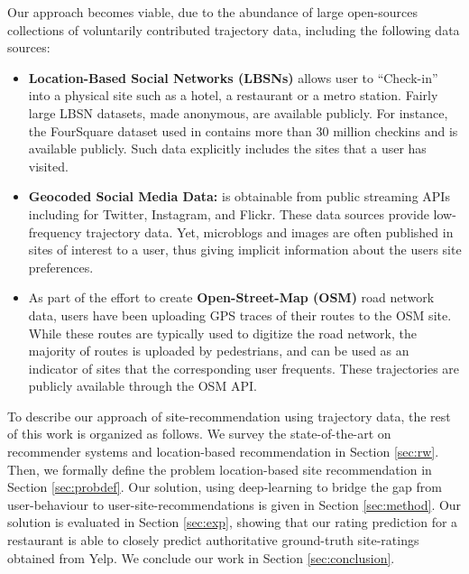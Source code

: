 Our approach becomes viable, due to the abundance of large open-sources collections of voluntarily contributed trajectory data, including the following data sources:
 \begin{itemize}
\item {\bf Location-Based Social Networks (LBSNs)} allows user to ``Check-in'' into a physical site such as a hotel, a restaurant or a metro station. Fairly large LBSN datasets, made anonymous, are available publicly. For instance, the FourSquare dataset used in \cite{yang2014modeling} contains more than 30 million checkins and is available publicly. Such data explicitly includes the sites that a user has visited. 
\item {\bf Geocoded Social Media Data: } is obtainable from public streaming APIs including for Twitter, Instagram, and Flickr. These data sources provide low-frequency trajectory data. Yet, microblogs and images are often published in sites of interest to a user, thus giving implicit information about the users site preferences.
\item  As part of the effort to create {\bf Open-Street-Map (OSM)} \cite{OSM,hw-osmugsm-08} road network data, users have been uploading GPS traces of their routes to the OSM site. While these routes are typically used to digitize the road network, the majority of routes is uploaded by pedestrians, and can be used as an indicator of sites that the corresponding user frequents. These trajectories are publicly available through the OSM API. 
\end{itemize}
To describe our approach of site-recommendation using trajectory data, the rest of this work is organized as follows. We survey the state-of-the-art on recommender systems and location-based recommendation in Section \ref{sec:rw}. Then, we formally define the problem location-based site recommendation in Section \ref{sec:probdef}. Our solution, using deep-learning to bridge the gap from user-behaviour to user-site-recommendations is given in Section \ref{sec:method}. Our solution is evaluated in Section \ref{sec:exp}, showing that our rating prediction for a restaurant is able to closely predict authoritative ground-truth site-ratings obtained from Yelp. We conclude our work in Section \ref{sec:conclusion}.  